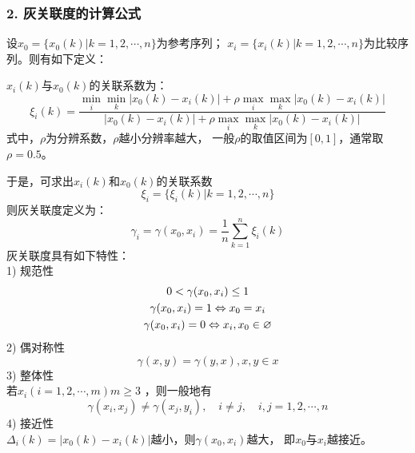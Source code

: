 \subsubsection*{2. 灰关联度的计算公式} 
设$x_0=\{x_0(k)|k=1,2, \cdots ,n\}$为参考序列；
$x_i=\{x_i(k)|k=1,2, \cdots ,n\}$为比较序列。则有如下定义：

$x_i(k)$与$x_0(k)$的关联系数为：
\begin{equation}
\xi_i(k)=\frac{\underset{i}{\min}\underset{k}{\min}|x_0(k)-x_i(k)|
				+\rho\underset{i}{\max}\underset{k}{\max}|x_0(k)-x_i(k)|}
			  {|x_0(k)-x_i(k)|
				+\rho\underset{i}{\max}\underset{k}{\max}|x_0(k)-x_i(k)|}
\end{equation}
式中，$\rho$为分辨系数，$\rho$越小分辨率越大，
一般$\rho$的取值区间为$[0,1]$，通常取$\rho=0.5$。

于是，可求出$x_i(k)$和$x_0(k)$的关联系数
\begin{equation}
\xi_i=\{\xi_i(k)|k=1,2,\cdots,n\}
\end{equation}
则灰关联度定义为：
\begin{equation}
\gamma_i=\gamma(x_0,x_i)=\frac{1}{n}\sum_{k=1}^{n}\xi_i(k)
\end{equation}
灰关联度具有如下特性： \\
1) 规范性
\begin{gather}
0 < \gamma(x_0,x_i) \le 1 \notag \\
\gamma(x_0,x_i) = 1 \Leftrightarrow x_0=x_i \\
\gamma(x_0,x_i) = 0 \Leftrightarrow x_i,x_0 \in \varnothing \notag
\end{gather}
2) 偶对称性
\begin{equation}
\gamma(x,y)=\gamma(y,x), x,y \in x
\end{equation}
3) 整体性 \\ 
若$x_i(i=1,2,\cdots,m) m \ge 3$ ，则一般地有
\begin{equation}
\gamma(x_i,x_j) \neq \gamma(x_j, y_i),\quad i\neq j,\quad i,j=1,2,\cdots,n
\end{equation}
4) 接近性 \\
$\Delta_i(k)=|x_0(k)-x_i(k)|$越小，则$\gamma(x_0,x_i)$越大，
即$x_0$与$x_i$越接近。
\\

